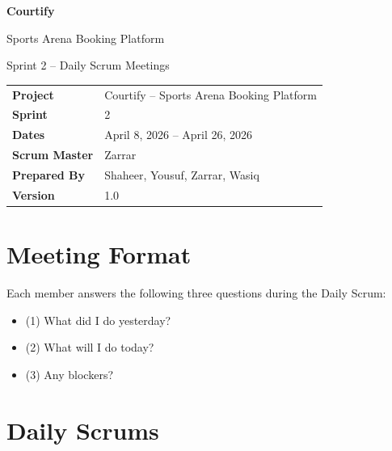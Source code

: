 \documentclass[12pt,a4paper]{article}
\begin{document}

\begin{titlepage}
\centering
\vspace*{2cm}
{\Huge\bfseries\color{sectionblue} Courtify}\par
\vspace{0.4cm}
{\Large Sports Arena Booking Platform}\par
\vspace{1.5cm}
{\huge Sprint 2 -- Daily Scrum Meetings}\par
\vspace{2cm}
\renewcommand{\arraystretch}{1.5}
\begin{tabular}{>{\bfseries}l p{10cm}}
Project      & Courtify -- Sports Arena Booking Platform \\
Sprint       & 2 \\
Dates        & April 8, 2026 -- April 26, 2026 \\
Scrum Master & Zarrar \\
Prepared By  & Shaheer, Yousuf, Zarrar, Wasiq \\
Version      & 1.0 \\
\end{tabular}
\end{titlepage}

\newpage

\section{Meeting Format}

Each member answers the following three questions during the Daily Scrum:
\begin{itemize}[noitemsep]
    \item (1) What did I do yesterday?
    \item (2) What will I do today?
    \item (3) Any blockers?
\end{itemize}

\vspace{1.5em}

\section{Daily Scrums}
\end{document}
